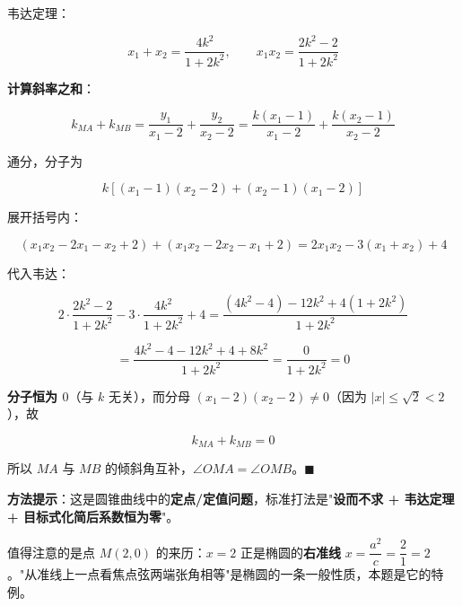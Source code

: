 \begin{answer}
韦达定理：

\nopagebreak[4]
\[x_1+x_2=\frac{4k^{2}}{1+2k^{2}},\qquad x_1x_2=\frac{2k^{2}-2}{1+2k^{2}}\]

\textbf{计算斜率之和}：

\nopagebreak[4]
\[k_{MA}+k_{MB}=\frac{y_1}{x_1-2}+\frac{y_2}{x_2-2}=\frac{k\left(x_1-1\right)}{x_1-2}+\frac{k\left(x_2-1\right)}{x_2-2}\]

通分，分子为

\nopagebreak[4]
\[k\left[\left(x_1-1\right)\left(x_2-2\right)+\left(x_2-1\right)\left(x_1-2\right)\right]\]

展开括号内：

\nopagebreak[4]
\[\left(x_1x_2-2x_1-x_2+2\right)+\left(x_1x_2-2x_2-x_1+2\right)=2x_1x_2-3\left(x_1+x_2\right)+4\]

代入韦达：

\nopagebreak[4]
\[2\cdot\frac{2k^{2}-2}{1+2k^{2}}-3\cdot\frac{4k^{2}}{1+2k^{2}}+4=\frac{\left(4k^{2}-4\right)-12k^{2}+4\left(1+2k^{2}\right)}{1+2k^{2}}\]

\nopagebreak[4]
\[=\frac{4k^{2}-4-12k^{2}+4+8k^{2}}{1+2k^{2}}=\frac{0}{1+2k^{2}}=0\]

\textbf{分子恒为 $0$}（与 $k$ 无关），而分母 $\left(x_1-2\right)\left(x_2-2\right)\ne0$（因为 $|x|\le\sqrt2<2$），故

\nopagebreak[4]
\[k_{MA}+k_{MB}=0\]

所以 $MA$ 与 $MB$ 的倾斜角互补，$\angle OMA=\angle OMB$。$\blacksquare$

\begin{gktip}
\textbf{方法提示}：这是圆锥曲线中的\textbf{定点/定值问题}，标准打法是"\textbf{设而不求 + 韦达定理 + 目标式化简后系数恒为零}"。

值得注意的是点 $M(2,0)$ 的来历：$x=2$ 正是椭圆的\textbf{右准线} $x=\dfrac{a^{2}}c=\dfrac21=2$。"从准线上一点看焦点弦两端张角相等"是椭圆的一条一般性质，本题是它的特例。
\end{gktip}

\par\medskip

\Needspace{0.5\textheight}



\end{answer}
